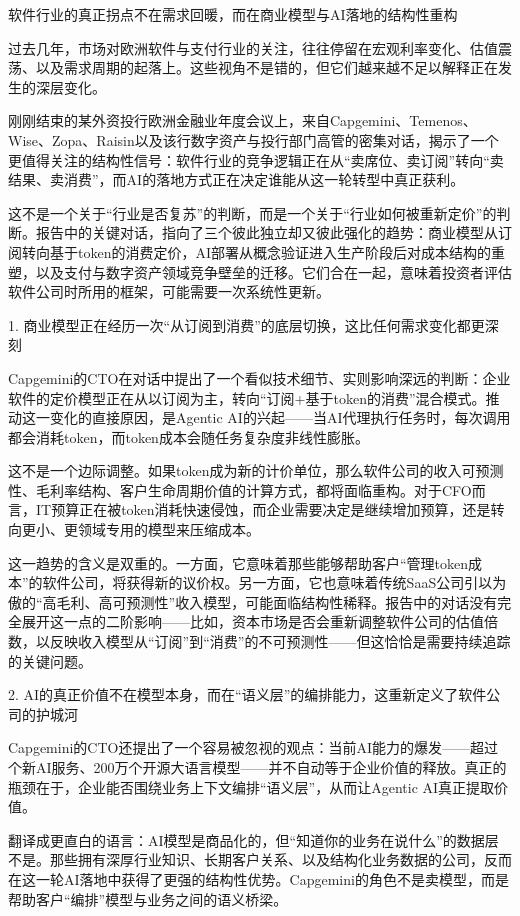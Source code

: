 \documentclass[11pt]{ctexart}
\begin{document}
软件行业的真正拐点不在需求回暖，而在商业模型与AI落地的结构性重构

过去几年，市场对欧洲软件与支付行业的关注，往往停留在宏观利率变化、估值震荡、以及需求周期的起落上。这些视角不是错的，但它们越来越不足以解释正在发生的深层变化。

刚刚结束的某外资投行欧洲金融业年度会议上，来自Capgemini、Temenos、Wise、Zopa、Raisin以及该行数字资产与投行部门高管的密集对话，揭示了一个更值得关注的结构性信号：软件行业的竞争逻辑正在从“卖席位、卖订阅”转向“卖结果、卖消费”，而AI的落地方式正在决定谁能从这一轮转型中真正获利。

这不是一个关于“行业是否复苏”的判断，而是一个关于“行业如何被重新定价”的判断。报告中的关键对话，指向了三个彼此独立却又彼此强化的趋势：商业模型从订阅转向基于token的消费定价，AI部署从概念验证进入生产阶段后对成本结构的重塑，以及支付与数字资产领域竞争壁垒的迁移。它们合在一起，意味着投资者评估软件公司时所用的框架，可能需要一次系统性更新。

1. 商业模型正在经历一次“从订阅到消费”的底层切换，这比任何需求变化都更深刻

Capgemini的CTO在对话中提出了一个看似技术细节、实则影响深远的判断：企业软件的定价模型正在从以订阅为主，转向“订阅+基于token的消费”混合模式。推动这一变化的直接原因，是Agentic AI的兴起——当AI代理执行任务时，每次调用都会消耗token，而token成本会随任务复杂度非线性膨胀。

这不是一个边际调整。如果token成为新的计价单位，那么软件公司的收入可预测性、毛利率结构、客户生命周期价值的计算方式，都将面临重构。对于CFO而言，IT预算正在被token消耗快速侵蚀，而企业需要决定是继续增加预算，还是转向更小、更领域专用的模型来压缩成本。

这一趋势的含义是双重的。一方面，它意味着那些能够帮助客户“管理token成本”的软件公司，将获得新的议价权。另一方面，它也意味着传统SaaS公司引以为傲的“高毛利、高可预测性”收入模型，可能面临结构性稀释。报告中的对话没有完全展开这一点的二阶影响——比如，资本市场是否会重新调整软件公司的估值倍数，以反映收入模型从“订阅”到“消费”的不可预测性——但这恰恰是需要持续追踪的关键问题。

2. AI的真正价值不在模型本身，而在“语义层”的编排能力，这重新定义了软件公司的护城河

Capgemini的CTO还提出了一个容易被忽视的观点：当前AI能力的爆发——超过 个新AI服务、200万个开源大语言模型——并不自动等于企业价值的释放。真正的瓶颈在于，企业能否围绕业务上下文编排“语义层”，从而让Agentic AI真正提取价值。

翻译成更直白的语言：AI模型是商品化的，但“知道你的业务在说什么”的数据层不是。那些拥有深厚行业知识、长期客户关系、以及结构化业务数据的公司，反而在这一轮AI落地中获得了更强的结构性优势。Capgemini的角色不是卖模型，而是帮助客户“编排”模型与业务之间的语义桥梁。
\end{document}
